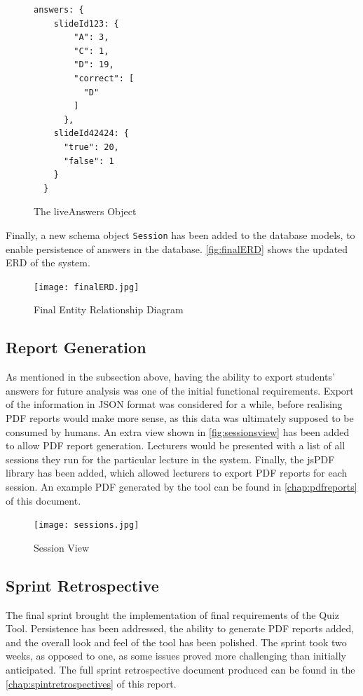 \begin{figure}[h!]
  \begin{lstlisting}[basicstyle=\small]
  answers: {
    slideId123: {
        "A": 3,
        "C": 1,
        "D": 19,
        "correct": [
          "D"
        ]
      },
    slideId42424: {
      "true": 20,
      "false": 1
    }
  }
  \end{lstlisting}
  \caption{The liveAnswers Object}
  \label{fig:answers}
\end{figure}

\newpage
Finally, a new schema object \texttt{Session} has been added to the database models,
to enable persistence of answers in the database. \autoref{fig:finalERD} shows the
updated ERD of the system.

\begin{figure}[h!]
    \centering
    \texttt{[image: finalERD.jpg]}
    \caption{Final Entity Relationship Diagram}
    \label{fig:finalERD}
\end{figure}

\subsection{Report Generation}
As mentioned in the subsection above, having the ability to export students' answers
for future analysis was one of the initial functional requirements. Export of
the information in JSON format was considered for a while, before realising PDF reports would
make more sense, as this data was ultimately supposed to be consumed by humans.
An extra view shown in \autoref{fig:sessionsview} has been added to allow PDF report generation.
Lecturers would be presented with a list of all sessions they run for the particular
lecture in the system. Finally, the jsPDF\cite{57} library has been added, which allowed
lecturers to export PDF reports for each session. An example PDF generated by the
tool can be found in \autoref{chap:pdfreports} of this document.

\begin{figure}[h!]
    \centering
    \texttt{[image: sessions.jpg]}
    \caption{Session View}
    \label{fig:sessionsview}
\end{figure}

\newpage
\subsection{Sprint Retrospective}
The final sprint brought the implementation of final requirements of the Quiz Tool.
Persistence has been addressed, the ability to generate PDF reports added, and
the overall look and feel of the tool has been polished. The sprint took two weeks,
as opposed to one, as some issues proved more challenging than initially anticipated.
The full sprint retrospective document produced can be found in the
\autoref{chap:spintretrospectives} of this report.

